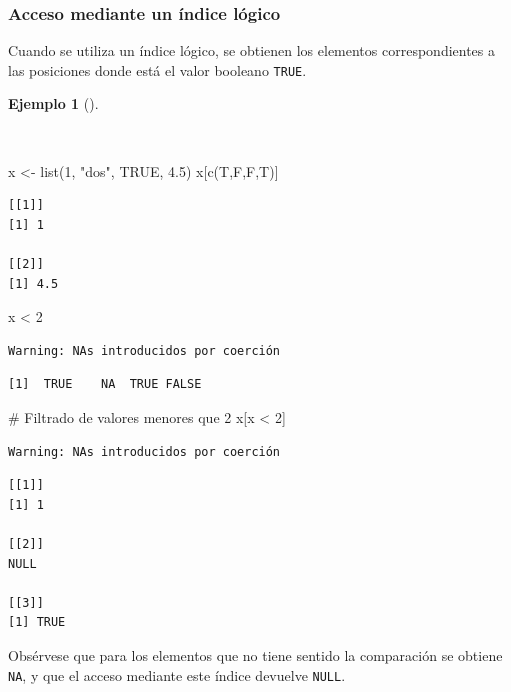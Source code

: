\documentclass[
  a4paper,
]{scrreport}
\newenvironment{Shaded}{\begin{snugshade}}{\end{snugshade}}
\newcommand{\CommentTok}[1]{\textcolor[rgb]{0.37,0.37,0.37}{#1}}
\newcommand{\ConstantTok}[1]{\textcolor[rgb]{0.56,0.35,0.01}{#1}}
\newcommand{\DecValTok}[1]{\textcolor[rgb]{0.68,0.00,0.00}{#1}}
\newcommand{\FloatTok}[1]{\textcolor[rgb]{0.68,0.00,0.00}{#1}}
\newcommand{\FunctionTok}[1]{\textcolor[rgb]{0.28,0.35,0.67}{#1}}
\newcommand{\NormalTok}[1]{\textcolor[rgb]{0.00,0.23,0.31}{#1}}
\newcommand{\OtherTok}[1]{\textcolor[rgb]{0.00,0.23,0.31}{#1}}
\newcommand{\SpecialCharTok}[1]{\textcolor[rgb]{0.37,0.37,0.37}{#1}}
\newcommand{\StringTok}[1]{\textcolor[rgb]{0.13,0.47,0.30}{#1}}
\theoremstyle{definition}
\theoremstyle{definition}
\newtheorem{example}{Ejemplo}[chapter]
\theoremstyle{remark}
\begin{document}
\hypertarget{acceso-mediante-un-uxedndice-luxf3gico-1}{%
\subsubsection{Acceso mediante un índice
lógico}\label{acceso-mediante-un-uxedndice-luxf3gico-1}}

Cuando se utiliza un índice lógico, se obtienen los elementos
correspondientes a las posiciones donde está el valor booleano
\texttt{TRUE}.

\begin{example}[]\protect\hypertarget{exm-acceso-listas-logico}{}\label{exm-acceso-listas-logico}

~

\begin{Shaded}
\begin{Highlighting}[]
\NormalTok{x }\OtherTok{\textless{}{-}} \FunctionTok{list}\NormalTok{(}\DecValTok{1}\NormalTok{, }\StringTok{"dos"}\NormalTok{, }\ConstantTok{TRUE}\NormalTok{, }\FloatTok{4.5}\NormalTok{)}
\NormalTok{x[}\FunctionTok{c}\NormalTok{(T,F,F,T)]}
\end{Highlighting}
\end{Shaded}

\begin{verbatim}
[[1]]
[1] 1

[[2]]
[1] 4.5
\end{verbatim}

\begin{Shaded}
\begin{Highlighting}[]
\NormalTok{x }\SpecialCharTok{\textless{}} \DecValTok{2}
\end{Highlighting}
\end{Shaded}

\begin{verbatim}
Warning: NAs introducidos por coerción
\end{verbatim}

\begin{verbatim}
[1]  TRUE    NA  TRUE FALSE
\end{verbatim}

\begin{Shaded}
\begin{Highlighting}[]
\CommentTok{\# Filtrado de valores menores que 2}
\NormalTok{x[x }\SpecialCharTok{\textless{}} \DecValTok{2}\NormalTok{]}
\end{Highlighting}
\end{Shaded}

\begin{verbatim}
Warning: NAs introducidos por coerción
\end{verbatim}

\begin{verbatim}
[[1]]
[1] 1

[[2]]
NULL

[[3]]
[1] TRUE
\end{verbatim}

Obsérvese que para los elementos que no tiene sentido la comparación se
obtiene \texttt{NA}, y que el acceso mediante este índice devuelve
\texttt{NULL}.

\end{example}
\end{document}
